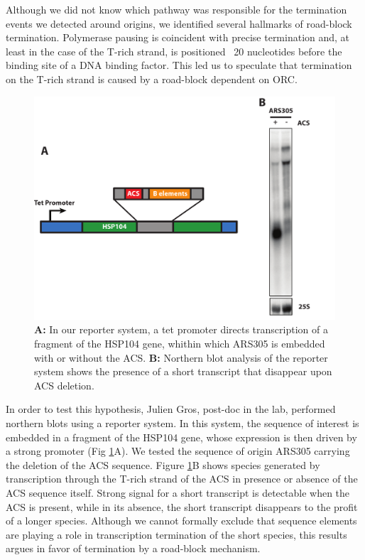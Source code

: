 Although we did not know which pathway was responsible for the termination events we detected around origins, we identified several hallmarks of road-block termination. Polymerase pausing is coincident with precise termination and, at least in the case of the T-rich strand, is positioned ~20 nucleotides before the binding site of a DNA binding factor. This led us to speculate that termination on the T-rich strand is caused by a road-block dependent on ORC. 

\begin{figure}[h]

\centering
\includegraphics[width=\textwidth]{figures/results/northern}
\caption[Northern blot analysis of transcription through ARS305]{\textbf{A: }In our reporter system, a tet promoter directs transcription of a fragment of the HSP104 gene, whithin which ARS305 is embedded with or without the ACS. \textbf{B: } Northern blot analysis of the reporter system shows the presence of a short transcript that disappear upon ACS deletion. }
\label{fig:northern}

\end{figure}  

In order to test this hypothesis, Julien Gros, post-doc in the lab, performed northern blots using a reporter system. In this system, the sequence of interest is embedded in a fragment of the HSP104 gene, whose expression is then driven by a strong promoter (Fig \ref{fig:northern}A). 
We tested the sequence of origin ARS305 carrying the deletion of the ACS sequence. 
Figure \ref{fig:northern}B shows species generated by transcription through the T-rich strand of the ACS in presence or absence of the ACS sequence itself. 
Strong signal for a short transcript is detectable when the ACS is present, while in its absence, the short transcript disappears to the profit of a longer species. 
Although we cannot formally exclude that sequence elements are playing a role in transcription termination of the short species, this results argues in favor of termination by a road-block mechanism.

